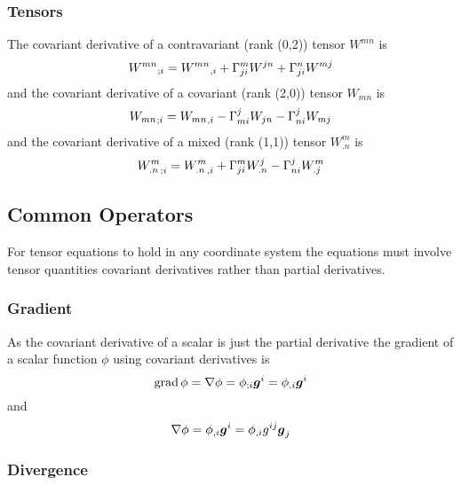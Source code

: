 \subsubsection{Tensors}

The covariant derivative of a contravariant (rank (0,2)) tensor $W^{mn}$ is
\begin{equation}
   {W^{mn}}_{;i} = {W^{mn}}_{,i} + \Gamma^{m}_{ji} W^{jn}+ \Gamma^{n}_{ji} W^{mj}
\end{equation}
and the covariant derivative of a covariant (rank (2,0)) tensor $W_{mn}$ is
\begin{equation}
   {W_{mn}}_{;i} = {W_{mn}}_{,i} - \Gamma^{j}_{mi} W_{jn}- \Gamma^{j}_{ni} W_{mj}
\end{equation}
and the covariant derivative of a mixed (rank (1,1)) tensor $W^{m}_{.n}$ is
\begin{equation}
   {W^{m}_{.n}}_{;i} = {W^{m}_{.n}}_{,i} + \Gamma^{m}_{ji} W^{j}_{.n}- \Gamma^{j}_{ni} W^{m}_{.j}
\end{equation}

\subsection{Common Operators}

For tensor equations to hold in any coordinate system the equations must
involve tensor quantities \ie covariant derivatives rather than partial derivatives.

\subsubsection{Gradient}

As the covariant derivative of a scalar is just the partial derivative the
gradient of a scalar function $\phi$ using covariant derivatives is
\begin{equation}
  \gradop \phi = \gradient{}{\phi}=\covarderiv{\phi}{i}\vectr{g}^{i}=\partialderiv{\phi}{i}\vectr{g}^{i}
\end{equation}
and
\begin{equation}
  \gradient{}{\phi}=\partialderiv{\phi}{i}\vectr{g}^{i}=\partialderiv{\phi}{i}g^{ij}\vectr{g}_{j}
\end{equation}

\subsubsection{Divergence}

